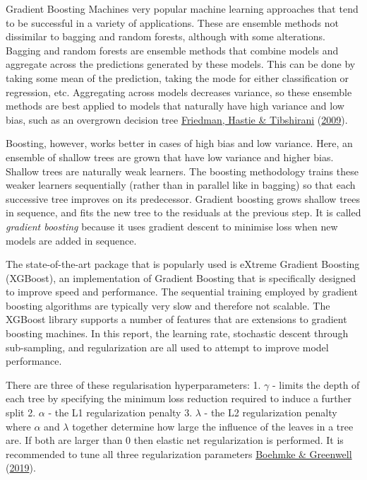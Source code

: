\documentclass[11pt,preprint, authoryear]{elsarticle}
\numberwithin{equation}{section}
\numberwithin{figure}{section}
\numberwithin{table}{section}
\begin{document}
Gradient Boosting Machines very popular machine learning approaches that
tend to be successful in a variety of applications. These are ensemble
methods not dissimilar to bagging and random forests, although with some
alterations. Bagging and random forests are ensemble methods that
combine models and aggregate across the predictions generated by these
models. This can be done by taking some mean of the prediction, taking
the mode for either classification or regression, etc. Aggregating
across models decreases variance, so these ensemble methods are best
applied to models that naturally have high variance and low bias, such
as an overgrown decision tree \protect\hyperlink{ref-ESL}{Friedman,
Hastie \& Tibshirani} (\protect\hyperlink{ref-ESL}{2009}).

Boosting, however, works better in cases of high bias and low variance.
Here, an ensemble of shallow trees are grown that have low variance and
higher bias. Shallow trees are naturally weak learners. The boosting
methodology trains these weaker learners sequentially (rather than in
parallel like in bagging) so that each successive tree improves on its
predecessor. Gradient boosting grows shallow trees in sequence, and fits
the new tree to the residuals at the previous step. It is called
\emph{gradient boosting} because it uses gradient descent to minimise
loss when new models are added in sequence.

The state-of-the-art package that is popularly used is eXtreme Gradient
Boosting (XGBoost), an implementation of Gradient Boosting that is
specifically designed to improve speed and performance. The sequential
training employed by gradient boosting algorithms are typically very
slow and therefore not scalable. The XGBoost library supports a number
of features that are extensions to gradient boosting machines. In this
report, the learning rate, stochastic descent through sub-sampling, and
regularization are all used to attempt to improve model performance.

There are three of these regularisation hyperparameters: 1. \(\gamma\) -
limits the depth of each tree by specifying the minimum loss reduction
required to induce a further split 2. \(\alpha\) - the L1 regularization
penalty 3. \(\lambda\) - the L2 regularization penalty where \(\alpha\)
and \(\lambda\) together determine how large the influence of the leaves
in a tree are. If both are larger than 0 then elastic net regularization
is performed. It is recommended to tune all three regularization
parameters \protect\hyperlink{ref-Boehmke}{Boehmke \& Greenwell}
(\protect\hyperlink{ref-Boehmke}{2019}).
\end{document}
